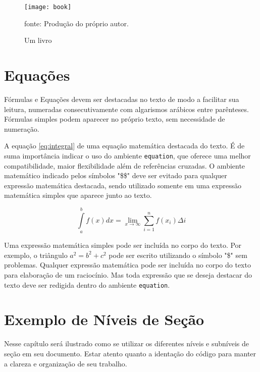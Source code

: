 \documentclass[
  12pt,		%
  a4paper,	%
  openright,%
  oneside,	%
  chapter=TITLE,		%
  section=TITLE,		%
  english,	%
  french,	%
  spanish,	%
  brazil	%
]{abntex2}
\begin{document}
                \begin{figure}[h]
                    \centering
                    \caption{Um livro}
                    \texttt{[image: book]}
                    \par
                    {\small fonte: Produção do próprio autor.}
                \end{figure}
    
    \chapter {Equações}
        
        Fórmulas e Equações devem ser destacadas no texto de modo a facilitar sua leitura, numeradas consecutivamente com algarismos arábicos entre parênteses. Fórmulas simples podem aparecer no próprio texto, sem necessidade de numeração.
        
        A equação \ref{eq:integral} de uma equação matemática destacada do texto. É de suma importância indicar o uso do ambiente \verb|equation|, que oferece uma melhor compatibilidade, maior flexibilidade além de referências cruzadas. O ambiente matemático indicado pelos símbolos "\$\$" deve ser evitado para qualquer expressão matemática destacada, sendo utilizado somente em uma expressão matemática simples que aparece junto ao texto.
        
        \begin{equation}
            \label{eq:integral}
            \int\limits_a^b f(x) dx = \lim_{x \to \infty} \displaystyle\sum_{i=1}^{n} f(x_i) \Delta i
        \end{equation}

        Uma expressão matemática simples pode ser incluída no corpo do texto. Por exemplo, o triângulo $a^2 = b^2 + c^2$ pode ser escrito utilizando o símbolo "\$" sem problemas. Qualquer expressão matemática pode ser incluída no corpo do texto para elaboração de um raciocínio. Mas toda expressão que se deseja destacar do texto deve ser redigida dentro do ambiente \verb|equation|.
    
    \chapter {Exemplo de Níveis de Seção}
    
        Nesse capítulo será ilustrado como se utilizar os diferentes níveis e subníveis de seção em seu documento. Estar atento quanto a identação do código para manter a clareza e organização de seu trabalho.
        
\end{document}
